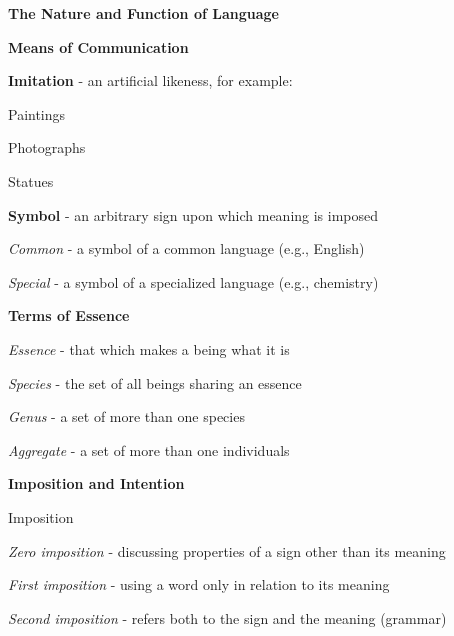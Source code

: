 \documentclass{report}
\begin{document}
\begin{outline}
\begin{outline}
\begin{outline}
     \end{outline}
  \end{outline}
  \item {\bf The Nature and Function of Language }
  \begin{outline}
    \item {\bf Means of Communication }
    \begin{outline}
      \item {\bf Imitation} - an artificial likeness, for example:
      \begin{outline}
        \item Paintings
        \item Photographs
        \item Statues
      \end{outline}
      \item {\bf Symbol} - an arbitrary sign upon which meaning is imposed
      \begin{outline}
	\item \textit{Common} - a symbol of a common language (e.g., English)
	\item \textit{Special} - a symbol of a specialized language (e.g., chemistry)
      \end{outline}
    \end{outline}
    \item {\bf Terms of Essence }
    \begin{outline}
      \item \textit{Essence} - that which makes a being what it is
      \item \textit{Species} - the set of all beings sharing an essence
      \item \textit{Genus} - a set of more than one species
      \item \textit{Aggregate} - a set of more than one individuals
    \end{outline}
    \item {\bf Imposition and Intention}
    \begin{outline}
      \item Imposition
      \begin{outline}
        \item \textit{Zero imposition} - discussing properties of a sign other than its meaning
        \item \textit{First imposition} - using a word only in relation to its meaning
        \item \textit{Second imposition} - refers both to the sign and the meaning (grammar)

\end{outline}
\end{outline}
\end{outline}
\end{outline}
\end{document}
